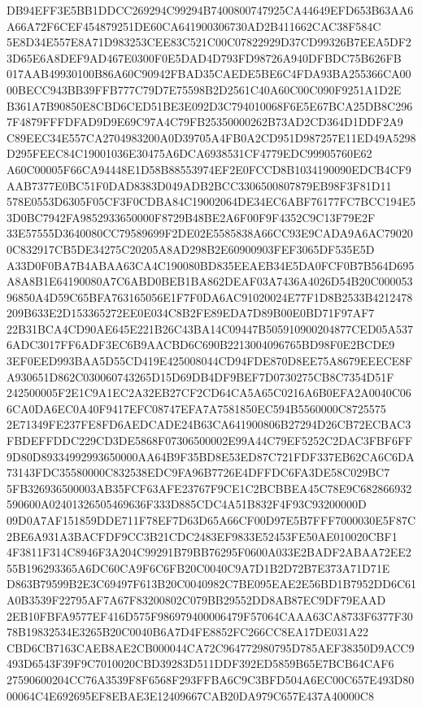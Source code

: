 \documentclass[UTF8,fontset=fandol,zihao=-4,a4paper]{ctexart}
\begin{document}
{{DB94EFF3E5BB1DDCC269294C99294B7400800747925CA44649EFD653B63AA6A66A72F6CEF454879251DE60CA641900306730AD2B411662CAC38F584C
5E8D34E557E8A71D983253CEE83C521C00C07822929D37CD99326B7EEA5DF23D65E6A8DEF9AD467E0300F0E5DAD4D793FD98726A940DFBDC75B626FB
017AAB49930100B86A60C90942FBAD35CAEDE5BE6C4FDA93BA255366CA0000BECC943BB39FFB777C79D7E75598B2D2561C40A60C00C090F9251A1D2E
B361A7B90850E8CBD6CED51BE3E092D3C794010068F6E5E67BCA25DB8C2967F4879FFFDFAD9D9E69C97A4C79FB25350000262B73AD2CD364D1DDF2A9
C89EEC34E557CA2704983200A0D39705A4FB0A2CD951D987257E11ED49A5298D295FEEC84C19001036E30475A6DCA6938531CF4779EDC99905760E62
A60C00005F66CA94448E1D58B88553974EF2E0FCCD8B1034190090EDCB4CF9AAB7377E0BC51F0DAD8383D049ADB2BCC3306500807879EB98F3F81D11
578E0553D6305F05CF3F0CDBA84C19002064DE34EC6ABF76177FC7BCC194E53D0BC7942FA9852933650000F8729B48BE2A6F00F9F4352C9C13F79E2F
33E57555D3640080CC79589699F2DE02E5585838A66CC93E9CADA9A6AC790200C832917CB5DE34275C20205A8AD298B2E60900903FEF3065DF535E5D
A33D0F0BA7B4ABAA63CA4C190080BD835EEAEB34E5DA0FCF0B7B564D695A8A8B1E64190080A7C6ABD0BEB1BA862DEAF03A7436A4026D54B20C000053
96850A4D59C65BFA763165056E1F7F0DA6AC91020024E77F1D8B2533B4212478209B633E2D153365272EE0E034C8B2FE89EDA7D89B00E0BD71F97AF7
22B31BCA4CD90AE645E221B26C43BA14C09447B505910900204877CED05A5376ADC3017FF6ADF3EC6B9AACBD6C690B2213004096765BD98F0E2BCDE9
3EF0EED993BAA5D55CD419E425008044CD94FDE870D8EE75A8679EEECE8FA930651D862C030060743265D15D69DB4DF9BEF7D0730275CB8C7354D51F
242500005F2E1C9A1EC2A32EB27CF2CD64CA5A65C0216A6B0EFA2A0040C066CA0DA6EC0A40F9417EFC08747EFA7A7581850EC594B5560000C8725575
2E71349FE237FE8FD6AEDCADE24B63CA641900806B27294D26CB72ECBAC3FBDEFFDDC229CD3DE5868F07306500002E99A44C79EF5252C2DAC3FBF6FF
9D80D89334992993650000AA64B9F35BD8E53ED87C721FDF337EB62CA6C6DA73143FDC35580000C832538EDC9FA96B7726E4DFFDC6FA3DE58C029BC7
5FB326936500003AB35FCF63AFE23767F9CE1C2BCBBEA45C78E9C682866932590600A02401326505469636F333D885CDC4A51B832F4F93C93200000D
09D0A7AF151859DDE711F78EF7D63D65A66CF00D97E5B7FFF7000030E5F87C2BE6A931A3BACFDF9CC3B21CDC2483EF9833E52453FE50AE010020CBF1
4F3811F314C8946F3A204C99291B79BB76295F0600A033E2BADF2ABAA72EE255B196293365A6DC60CA9F6C6FB20C0040C9A7D1B2D72B7E373A71D71E
D863B79599B2E3C69497F613B20C0040982C7BE095EAE2E56BD1B7952DD6C61A0B3539F22795AF7A67F83200802C079BB29552DD8AB87EC9DF79EAAD
2EB10FBFA9577EF416D575F986979400006479F57064CAAA63CA8733F6377F3078B19832534E3265B20C0040B6A7D4FE8852FC266CC8EA17DE031A22
CBD6CB7163CAEB8AE2CB000044CA72C964772980795D785AEF38350D9ACC9493D6543F39F9C7010020CBD39283D511DDF392ED5859B65E7BCB64CAF6
27590600204CC76A3539F8F6568F293FFBA6C9C3BFD504A6EC00C657E493D8000064C4E692695EF8EBAE3E12409667CAB20DA979C657E437A40000C8
}}
\end{document}

